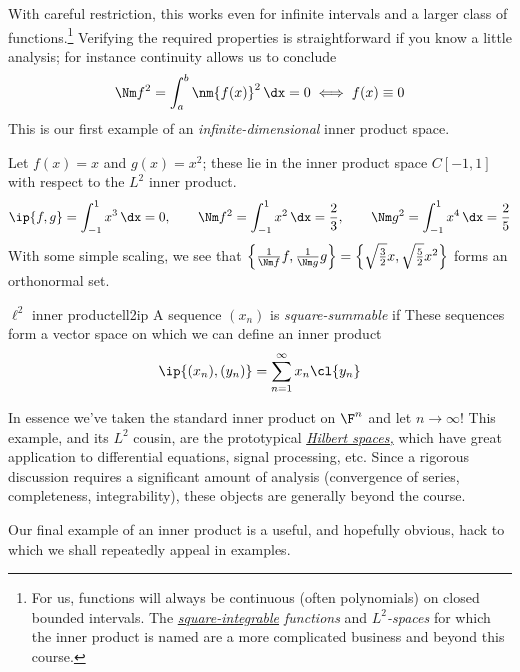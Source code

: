 With careful restriction, this works even for infinite intervals and a larger class of functions.\footnote{For us, functions will always be continuous (often polynomials) on closed bounded intervals. The \emph{\href{https://en.wikipedia.org/wiki/Square-integrable_function}{square-integrable} functions} and \emph{$L^2$-spaces} for which the inner product is named are a more complicated business and beyond this course.} Verifying the required properties is straightforward if you know a little analysis; for instance continuity allows us to conclude
\[\Nm f^2=\int_a^b\nm{f(x)}^2\,\dx=0\iff f(x)\equiv 0\]
This is our first example of an \emph{infinite-dimensional} inner product space.

\begin{example}{}{}
Let $f(x)=x$ and $g(x)=x^2$; these lie in the inner product space $C[-1,1]$ with respect to the $L^2$ inner product.
\[\ip{f,g}=\int_{-1}^1x^3\,\dx=0,\qquad \Nm f^2=\int_{-1}^1x^2\,\dx=\frac 23,\qquad \Nm g^2=\int_{-1}^1x^4\,\dx=\frac 25\]
With some simple scaling, we see that $\left\{\frac 1{\Nm f}f,\frac 1{\Nm g}g\right\}=\left\{\sqrt{\frac 32}x,\sqrt{\frac 52}x^2\right\}$ forms an orthonormal set.
\end{example}
\goodbreak

\begin{defn}{$\ell^2$ inner product}{ell2ip}
A sequence $(x_n)$ is \emph{square-summable} if  These sequences form a vector space on which we can define an inner product\footnotemark
\[\ip{(x_n),(y_n)}=\sum_{n=1}^\infty x_n\cl{y_n}\]
\end{defn}


In essence we've taken the standard inner product on $\F^n$ and let $n\to\infty$! This example, and its $L^2$ cousin, are the prototypical \emph{\href{https://en.wikipedia.org/wiki/Hilbert_space}{Hilbert spaces,}} which have great application to differential equations, signal processing, etc. Since a rigorous discussion requires a significant amount of analysis (convergence of series, completeness, integrability), these objects are generally beyond the course.\medbreak

Our final example of an inner product is a useful, and hopefully obvious, hack to which we shall repeatedly appeal in examples.

